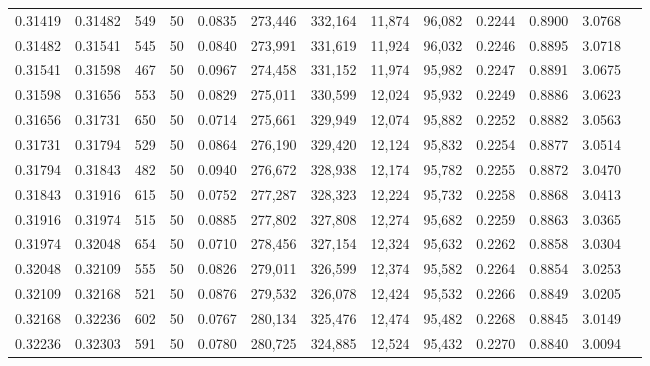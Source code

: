 \begin{tabular}{rrrrrrrrrrrrr}
0.31419 & 0.31482 &   549 &  50 &                                     0.0835 & 273,446 & 332,164 &  11,874 &  96,082 & 0.2244 & 0.8900 & 3.0768 \\
0.31482 & 0.31541 &   545 &  50 &                                     0.0840 & 273,991 & 331,619 &  11,924 &  96,032 & 0.2246 & 0.8895 & 3.0718 \\
0.31541 & 0.31598 &   467 &  50 &                                     0.0967 & 274,458 & 331,152 &  11,974 &  95,982 & 0.2247 & 0.8891 & 3.0675 \\
0.31598 & 0.31656 &   553 &  50 &                                     0.0829 & 275,011 & 330,599 &  12,024 &  95,932 & 0.2249 & 0.8886 & 3.0623 \\
0.31656 & 0.31731 &   650 &  50 &                                     0.0714 & 275,661 & 329,949 &  12,074 &  95,882 & 0.2252 & 0.8882 & 3.0563 \\
0.31731 & 0.31794 &   529 &  50 &                                     0.0864 & 276,190 & 329,420 &  12,124 &  95,832 & 0.2254 & 0.8877 & 3.0514 \\
0.31794 & 0.31843 &   482 &  50 &                                     0.0940 & 276,672 & 328,938 &  12,174 &  95,782 & 0.2255 & 0.8872 & 3.0470 \\
0.31843 & 0.31916 &   615 &  50 &                                     0.0752 & 277,287 & 328,323 &  12,224 &  95,732 & 0.2258 & 0.8868 & 3.0413 \\
0.31916 & 0.31974 &   515 &  50 &                                     0.0885 & 277,802 & 327,808 &  12,274 &  95,682 & 0.2259 & 0.8863 & 3.0365 \\
0.31974 & 0.32048 &   654 &  50 &                                     0.0710 & 278,456 & 327,154 &  12,324 &  95,632 & 0.2262 & 0.8858 & 3.0304 \\
0.32048 & 0.32109 &   555 &  50 &                                     0.0826 & 279,011 & 326,599 &  12,374 &  95,582 & 0.2264 & 0.8854 & 3.0253 \\
0.32109 & 0.32168 &   521 &  50 &                                     0.0876 & 279,532 & 326,078 &  12,424 &  95,532 & 0.2266 & 0.8849 & 3.0205 \\
0.32168 & 0.32236 &   602 &  50 &                                     0.0767 & 280,134 & 325,476 &  12,474 &  95,482 & 0.2268 & 0.8845 & 3.0149 \\
0.32236 & 0.32303 &   591 &  50 &                                     0.0780 & 280,725 & 324,885 &  12,524 &  95,432 & 0.2270 & 0.8840 & 3.0094 \\

\end{tabular}
